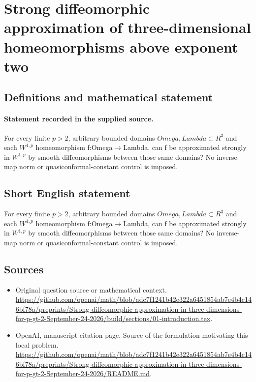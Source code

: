 \documentclass[11pt]{article}
\begin{document}
\section*{Strong diffeomorphic approximation of three-dimensional homeomorphisms above exponent two}\label{statement}
\subsection{Definitions and mathematical statement}
\paragraph{Statement recorded in the supplied source.}
For every finite $p>2$, arbitrary bounded domains $Omega,Lambda\subset R^3$ and each $W^{1,p}$ homeomorphism f:Omega$\to$Lambda, can f be approximated strongly in $W^{1,p}$ by smooth diffeomorphisms between those same domains? No inverse-map norm or quasiconformal-constant control is imposed.
\subsection{Short English statement}
For every finite $p>2$, arbitrary bounded domains $Omega,Lambda\subset R^3$ and each $W^{1,p}$ homeomorphism f:Omega$\to$Lambda, can f be approximated strongly in $W^{1,p}$ by smooth diffeomorphisms between those same domains? No inverse-map norm or quasiconformal-constant control is imposed.
\subsection{Sources}
\begin{itemize}
\item[S1] Original question source or mathematical context.
\url{https://github.com/openai/math/blob/adc7f1241b42e322a6451854ab7e4b4c146bf78a/preprints/Strong-diffeomorphic-approximation-in-three-dimensions-for-p-gt-2-September-24-2026/build/sections/01-introduction.tex}.
\item[S2] OpenAI, manuscript citation page. Source of the formulation motivating this local problem.
\url{https://github.com/openai/math/blob/adc7f1241b42e322a6451854ab7e4b4c146bf78a/preprints/Strong-diffeomorphic-approximation-in-three-dimensions-for-p-gt-2-September-24-2026/README.md}.
\end{itemize}
\end{document}
